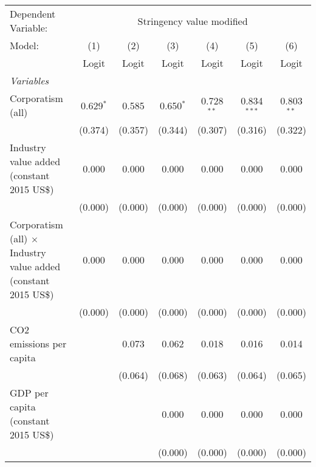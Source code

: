 
\begingroup
\centering
\begin{tabular}{lcccccc}
   \toprule
   Dependent Variable: & \multicolumn{6}{c}{Stringency value modified}\\
   Model:                                                                 & (1)         & (2)     & (3)         & (4)          & (5)           & (6)\\  
                                                                          &  Logit      & Logit   & Logit       & Logit        & Logit         & Logit\\  
   \midrule
   \emph{Variables}\\
   Corporatism (all)                                                      & 0.629$^{*}$ & 0.585   & 0.650$^{*}$ & 0.728$^{**}$ & 0.834$^{***}$ & 0.803$^{**}$\\   
                                                                          & (0.374)     & (0.357) & (0.344)     & (0.307)      & (0.316)       & (0.322)\\   
   Industry value added (constant 2015 US\$)                              & 0.000       & 0.000   & 0.000       & 0.000        & 0.000         & 0.000\\   
                                                                          & (0.000)     & (0.000) & (0.000)     & (0.000)      & (0.000)       & (0.000)\\   
   Corporatism (all) $\times$ Industry value added (constant 2015 US\$)   & 0.000       & 0.000   & 0.000       & 0.000        & 0.000         & 0.000\\   
                                                                          & (0.000)     & (0.000) & (0.000)     & (0.000)      & (0.000)       & (0.000)\\   
   CO2 emissions per capita                                               &             & 0.073   & 0.062       & 0.018        & 0.016         & 0.014\\   
                                                                          &             & (0.064) & (0.068)     & (0.063)      & (0.064)       & (0.065)\\   
   GDP per capita (constant 2015 US\$)                                    &             &         & 0.000       & 0.000        & 0.000         & 0.000\\   
                                                                          &             &         & (0.000)     & (0.000)      & (0.000)       & (0.000)\\   

\end{tabular}
